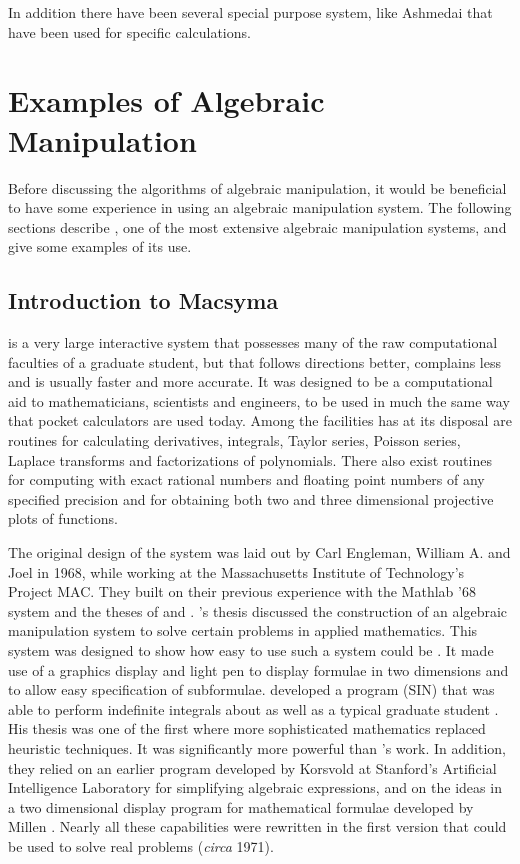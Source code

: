In addition there have been several special purpose system, like Ashmedai
\cite{Levine76} that have been used for specific calculations.

\section{Examples of Algebraic Manipulation}
 
Before discussing the algorithms of algebraic manipulation, it would be
beneficial to have some experience in using an algebraic manipulation
system.  The following sections describe {\Macsyma}, one of the most extensive
algebraic manipulation systems, and give some examples of its use.

\subsection{Introduction to Macsyma}
\label{Macsyma:Intro:Sec}

{\Macsyma} is a very large interactive system that possesses many of the
raw computational faculties of a graduate student, but that follows
directions better, complains less and is usually faster and more accurate.
It was designed to be a computational aid to mathematicians, scientists and
engineers, to be used in much the same way that pocket calculators are used
today.  Among the facilities {\Macsyma} has at its disposal are routines for
calculating derivatives, integrals, Taylor series, Poisson series, Laplace
transforms and factorizations of polynomials.  There also exist routines
for computing with exact rational numbers and floating point numbers of any
specified precision and for obtaining both two and three dimensional
projective plots of functions.

The original design of the {\Macsyma} system was laid out by Carl Engleman,
William A.  {\MartinW} and Joel {\MosesJ} in 1968, while working at the
Massachusetts Institute of Technology's Project MAC.  They built on their
previous experience with the {\sc Mathlab} '68 system and the theses of
{\MartinW} and {\MosesJ}.  {\MartinW}'s thesis discussed the construction of an
algebraic manipulation system to solve certain problems in applied
mathematics.  This system was designed to show how easy to use such a
system could be \cite{Martin:MathLab}.  It made use of a graphics display
and light pen to display formulae in two dimensions and to allow easy
specification of subformulae.  {\MosesJ} developed a program (SIN) that was
able to perform indefinite integrals about as well as a typical graduate
student \cite{Moses68}.  His thesis was one of the first where more
sophisticated mathematics replaced heuristic techniques.  It was
significantly more powerful than {\Slagle}'s work.  In addition, they relied
on an earlier program developed by Korsvold
\cite{Korsvold:Report,Korsvold:Paper} at Stanford's Artificial Intelligence
Laboratory for simplifying
algebraic expressions, and on the ideas in a two dimensional display
program for mathematical formulae developed by Millen \cite{Millen}.
Nearly all these capabilities were rewritten in the first version that
could be used to solve real problems ({\em circa} 1971).

